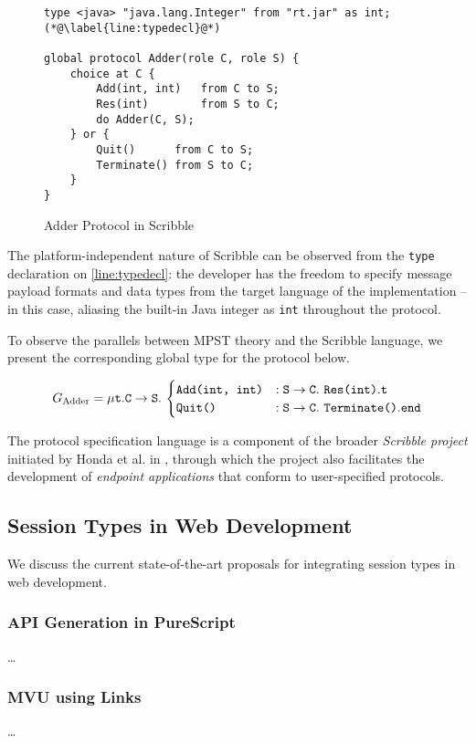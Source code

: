 \begin{figure}[!ht]
\begin{lstlisting}[language=Scribble]
type <java> "java.lang.Integer" from "rt.jar" as int; (*@\label{line:typedecl}@*)

global protocol Adder(role C, role S) {
	choice at C {
		Add(int, int)	from C to S;
		Res(int)		from S to C;
		do Adder(C, S);
	} or {
		Quit()		from C to S;
		Terminate()	from S to C;	
	}
}
\end{lstlisting}
\caption{Adder Protocol in Scribble}
\label{fig:adder}
\end{figure}

The platform-independent nature of Scribble 
can be observed from the \texttt{type} declaration 
on \cref{line:typedecl}: 
the developer has the freedom to specify message payload formats 
and data types from the target language of the implementation 
-- in this case, aliasing the built-in Java integer as 
\texttt{int} throughout the protocol.

To observe the parallels between MPST theory
and the Scribble language,
we present the corresponding global type for
the  protocol below.

\[
G_\text{Adder} = \mu\textnormal{\texttt{t}}.{
{\mathtt{C}} \to {\mathtt{S}}. ~ {
	\begin{cases}
		\texttt{Add(int, int)} & :
			{\mathtt{S}} \to {\mathtt{C}}. ~ {\texttt{Res(int)}}. \textnormal{\texttt{t}} \\
		\texttt{Quit()} & : 
			{\mathtt{S}} \to {\mathtt{C}}. ~ {\texttt{Terminate()}}. \textnormal{\texttt{end}} \\		
	\end{cases}
}} 
\]

The protocol specification language is a component of the broader 
\textit{Scribble project} initiated by Honda et al. in \cite{Scribble}, 
through which the project also facilitates the development of 
\textit{endpoint applications} that conform to user-specified protocols.

\subsection{Session Types in Web Development}
\label{subsection:sessiontypewebdev}

We discuss the current state-of-the-art proposals
for integrating session types in web development.

\subsubsection{API Generation in PureScript}
\dots

\subsubsection{MVU using Links}
\dots